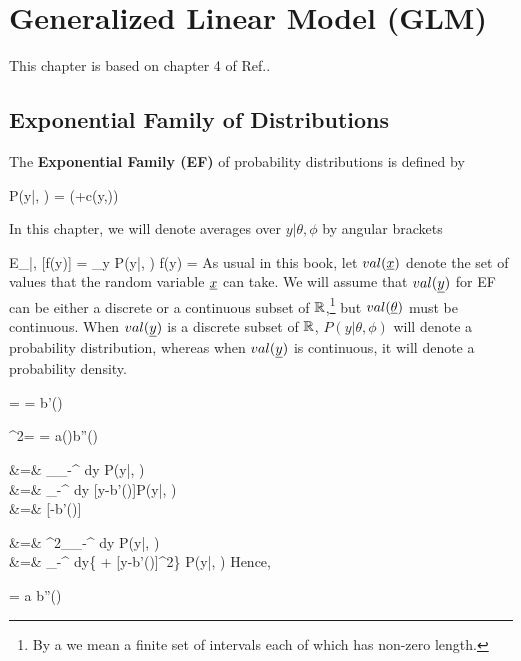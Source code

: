 \chapter{Generalized Linear Model (GLM)}
\label{ch-gen-lin-mod}

This chapter is based on
chapter 4 of Ref.\cite{agresti-book}.

\section{Exponential Family of Distributions}
\label{sec-exp-fam}

The {\bf Exponential Family (EF)} of probability distributions is defined by

\beq
P(y|\theta, \phi) =
\exp\left(+c(y,\phi)\right)
\eeq

In this chapter, we will
denote averages over $y|\theta, \phi$ by angular brackets

\beq
E_{\rvy|\theta, \phi}[f(y)] = \sum_y P(y|\theta, \phi) f(y) = 
\eeq
As usual in this book, let $val(\rvx)$ denote the set of
values that the random variable $\rvx$ can take.
We will assume that $val(\rvy)$
for EF
can be either a discrete or a continuous
subset of ${ \mathbb{R}}$,\footnote{By a  we
mean a finite set of intervals
 each of which has non-zero length.}
but $val(\ul{\theta})$
must be continuous.
When $val(\rvy)$ is a discrete subset of ${ \mathbb{R}}$, $P(y|\theta, \phi)$
will denote a probability distribution, whereas when
$val(\rvy)$ is continuous, it will denote
a probability density.

\begin{claim}
\beq
\mu = \av{\rvy} = b'(\theta)
\eeq

\beq
\s^2= \av{\rvy, \rvy} = a(\phi)b''(\theta)
\eeq
\end{claim}
\proof

&=& \partial_\theta \int_{-\infty}^\infty
dy\; P(y|\theta, \phi)
\\
&=&
\int_{-\infty}^\infty
dy\;
[y-b'(\theta)]P(y|\theta, \phi)
\\
&=&
[\av{\rvy}-b'(\theta)]
\eeqa

&=& \partial^2_\theta \int_{-\infty}^\infty
dy\; P(y|\theta, \phi)
\\
&=&
\int_{-\infty}^\infty
dy\;\left\{ +
[y-b'(\theta)]^2\right\}
P(y|\theta, \phi)
\eeqa
Hence,

\beq
{}= a b''(\theta)
\eeq


